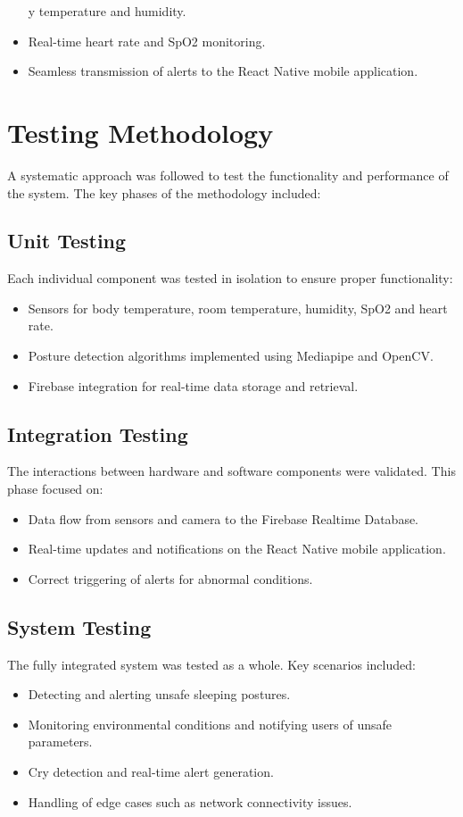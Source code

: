 \documentclass[12pt,a4paper]{report}
\begin{document}
\begin{itemize}
y temperature and humidity.
    \item Real-time heart rate and SpO2 monitoring.
    \item Seamless transmission of alerts to the React Native mobile application.
\end{itemize}

\section{Testing Methodology}
A systematic approach was followed to test the functionality and performance of the system. The key phases of the methodology included:

\subsection{Unit Testing}
Each individual component was tested in isolation to ensure proper functionality:
\begin{itemize}
    \item Sensors for body temperature, room temperature, humidity, SpO2 and heart rate.
    \item Posture detection algorithms implemented using Mediapipe and OpenCV.
    \item Firebase integration for real-time data storage and retrieval.
\end{itemize}

\subsection{Integration Testing}
The interactions between hardware and software components were validated. This phase focused on:
\begin{itemize}
    \item Data flow from sensors and camera to the Firebase Realtime Database.
    \item Real-time updates and notifications on the React Native mobile application.
    \item Correct triggering of alerts for abnormal conditions.
\end{itemize}

\subsection{System Testing}
The fully integrated system was tested as a whole. Key scenarios included:
\begin{itemize}
    \item Detecting and alerting unsafe sleeping postures.
    \item Monitoring environmental conditions and notifying users of unsafe parameters.
    \item Cry detection and real-time alert generation.
    \item Handling of edge cases such as network connectivity issues.
\end{itemize}
\end{document}
